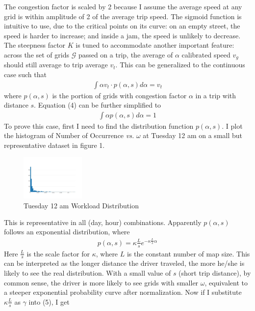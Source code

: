 \documentclass[letterpaper, 10 pt, conference]{ieeeconf}
\begin{document}
\begin{enumerate}
The congestion factor is scaled by 2 because I assume the average speed at any grid is within amplitude of 2 of the average trip speed. The sigmoid function is intuitive to use, due to the critical points on its curve: on an empty street, the speed is harder to increase; and inside a jam, the speed is unlikely to decrease. The steepness factor $K$ is tuned to accommodate another important feature: across the set of grids $\mathcal{G}$ passed on a trip, the average of $\alpha$ calibrated speed $v_g$ should still average to trip average $v_t$. This can be generalized to the continuous case such that
\begin{align}
\int \alpha v_t\cdot p(\alpha, s)d\alpha = v_t
\end{align}
where $p(\alpha, s)$ is the portion of grids with congestion factor $\alpha$ in a trip with distance $s$. Equation (4) can be further simplified to
\begin{align}
\int \alpha p(\alpha, s)d\alpha = 1
\end{align}
To prove this case, first I need to find the distribution function $p(\alpha,s)$. I plot the histogram of Number of Occurrence \textit{vs.} $\omega$ at Tuesday 12 am on a small but representative dataset in figure 1. 
\begin{figure}
\centering
\includegraphics[width=0.28\textwidth]{0am-busy.jpeg}
\caption{Tuesday 12 am Workload Distribution}
\end{figure}
This is representative in all (day, hour) combinations. Apparently $p(\alpha, s)$ follows an exponential distribution, where
\begin{align}
p(\alpha, s) = \kappa\frac{L}{s}e^{-\kappa\frac{L}{s}\alpha}
\end{align}
Here $\frac{L}{s}$ is the scale factor for $\kappa$, where $L$ is the constant number of map size. This can be interpreted as the longer distance the driver traveled, the more he/she is likely to see the real distribution. With a small value of $s$ (short trip distance), by common sense, the driver is more likely to see grids with smaller $\omega$, equivalent to a steeper exponential probability curve after normalization. Now if I substitute $\kappa\frac{L}{s}$ as $\gamma$ into (5), I get 
\begin{align}

\end{align}
\end{enumerate}
\end{document}
